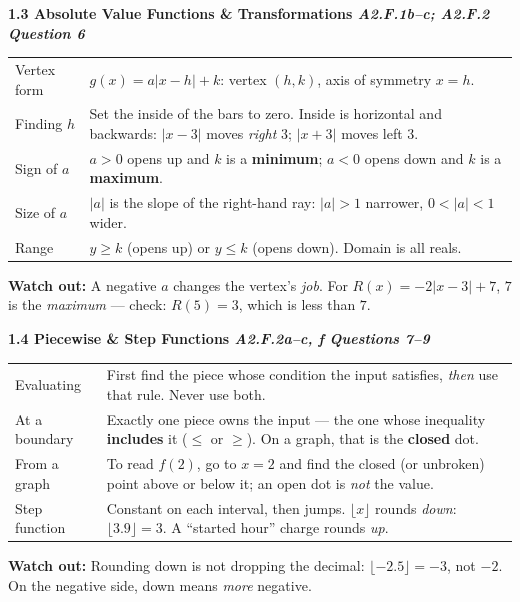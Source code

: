 \documentclass[10pt]{article}
\newcommand{\sghead}[2]{%
  \boxguard[10]%
  \vspace{4pt}\par\noindent
  \colorbox{forest}{\parbox{\dimexpr\linewidth-2\fboxsep}{%
    \small\color{white}\bfseries #1 \hfill \textmd{\itshape\scriptsize\color{forestmid} #2}}}%
  \vspace{2pt}\par}
\newcommand{\sgwatch}[1]{%
  \vspace{1pt}\par\noindent
  \colorbox{redbg}{\parbox{\dimexpr\linewidth-2\fboxsep}{%
    \footnotesize\textbf{\textcolor{redacc}{Watch out:}} #1}}%
  \vspace{1pt}\par}
\newcommand{\sgtabsetup}{\renewcommand{\arraystretch}{1.06}\footnotesize}
\begin{document}
\sghead{1.3 \quad Absolute Value Functions \& Transformations}{A2.F.1b--c; A2.F.2 \;\textbullet\; Question 6}
{\sgtabsetup
\begin{tabularx}{\linewidth}{@{} G X @{}}
Vertex form & $g(x)=a|x-h|+k$: vertex $(h,k)$, axis of symmetry $x=h$. \\
Finding $h$ & Set the inside of the bars to zero. Inside is horizontal and backwards: $|x-3|$
  moves \emph{right} $3$; $|x+3|$ moves left $3$. \\
Sign of $a$ & $a>0$ opens up and $k$ is a \textbf{minimum}; $a<0$ opens down and $k$ is a
  \textbf{maximum}. \\
Size of $a$ & $|a|$ is the slope of the right-hand ray: $|a|>1$ narrower, $0<|a|<1$ wider. \\
Range & $y\ge k$ (opens up) or $y\le k$ (opens down). Domain is all reals. \\
\end{tabularx}}
\sgwatch{A negative $a$ changes the vertex's \emph{job}. For $R(x)=-2|x-3|+7$, $7$ is the
\emph{maximum} --- check: $R(5)=3$, which is less than $7$.}

\sghead{1.4 \quad Piecewise \& Step Functions}{A2.F.2a--c, f \;\textbullet\; Questions 7--9}
{\sgtabsetup
\begin{tabularx}{\linewidth}{@{} G X @{}}
Evaluating & First find the piece whose condition the input satisfies, \emph{then} use that rule.
  Never use both. \\
At a boundary & Exactly one piece owns the input --- the one whose inequality \textbf{includes} it
  ($\le$ or $\ge$). On a graph, that is the \textbf{closed} dot. \\
From a graph & To read $f(2)$, go to $x=2$ and find the closed (or unbroken) point above or below
  it; an open dot is \emph{not} the value. \\
Step function & Constant on each interval, then jumps. $\lfloor x\rfloor$ rounds \emph{down}:
  $\lfloor 3.9\rfloor=3$. A ``started hour'' charge rounds \emph{up}. \\
\end{tabularx}}
\sgwatch{Rounding down is not dropping the decimal: $\lfloor -2.5\rfloor=-3$, not $-2$. On the
negative side, down means \emph{more} negative.}
\end{document}
